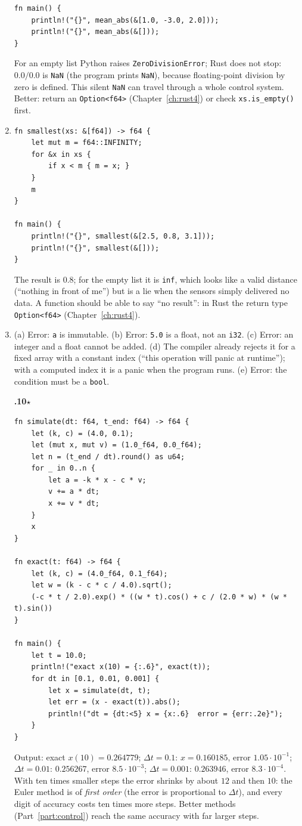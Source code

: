 \begin{enumerate}[label=\textbf{\ansnum.\arabic*}]
\begin{verbatim}
fn main() {
    println!("{}", mean_abs(&[1.0, -3.0, 2.0]));
    println!("{}", mean_abs(&[]));
}
\end{verbatim}
For an empty list Python raises \verb!ZeroDivisionError!; Rust does not stop: $0.0/0.0$ is \verb!NaN! (the program prints \verb!NaN!), because floating-point division by zero is defined. This silent \verb!NaN! can travel through a whole control system. Better: return an \verb!Option<f64>! (Chapter~\ref{ch:rust4}) or check \verb!xs.is_empty()! first.
  \item
\begin{verbatim}
fn smallest(xs: &[f64]) -> f64 {
    let mut m = f64::INFINITY;
    for &x in xs {
        if x < m { m = x; }
    }
    m
}

fn main() {
    println!("{}", smallest(&[2.5, 0.8, 3.1]));
    println!("{}", smallest(&[]));
}
\end{verbatim}
The result is $0.8$; for the empty list it is \verb!inf!, which looks like a valid distance (``nothing in front of me'') but is a lie when the sensors simply delivered no data. A function should be able to say ``no result'': in Rust the return type \verb!Option<f64>! (Chapter~\ref{ch:rust4}).
  \item (a) Error: \verb!a! is immutable. (b) Error: \verb!5.0! is a float, not an \verb!i32!. (c) Error: an integer and a float cannot be added. (d) The compiler already rejects it for a fixed array with a constant index (``this operation will panic at runtime''); with a computed index it is a panic when the program runs. (e) Error: the condition must be a \verb!bool!.
  \item[\textbf{\ansnum.10}$\star$]
\begin{verbatim}
fn simulate(dt: f64, t_end: f64) -> f64 {
    let (k, c) = (4.0, 0.1);
    let (mut x, mut v) = (1.0_f64, 0.0_f64);
    let n = (t_end / dt).round() as u64;
    for _ in 0..n {
        let a = -k * x - c * v;
        v += a * dt;
        x += v * dt;
    }
    x
}

fn exact(t: f64) -> f64 {
    let (k, c) = (4.0_f64, 0.1_f64);
    let w = (k - c * c / 4.0).sqrt();
    (-c * t / 2.0).exp() * ((w * t).cos() + c / (2.0 * w) * (w * t).sin())
}

fn main() {
    let t = 10.0;
    println!("exact x(10) = {:.6}", exact(t));
    for dt in [0.1, 0.01, 0.001] {
        let x = simulate(dt, t);
        let err = (x - exact(t)).abs();
        println!("dt = {dt:<5} x = {x:.6}  error = {err:.2e}");
    }
}
\end{verbatim}
Output: exact $x(10)=0.264779$; $\Delta t=0.1$: $x=0.160185$, error $1.05\cdot10^{-1}$; $\Delta t=0.01$: $0.256267$, error $8.5\cdot10^{-3}$; $\Delta t=0.001$: $0.263946$, error $8.3\cdot10^{-4}$. With ten times smaller steps the error shrinks by about $12$ and then $10$: the Euler method is of \emph{first order} (the error is proportional to $\Delta t$), and every digit of accuracy costs ten times more steps. Better methods (Part~\ref{part:control}) reach the same accuracy with far larger steps.
\end{enumerate}
